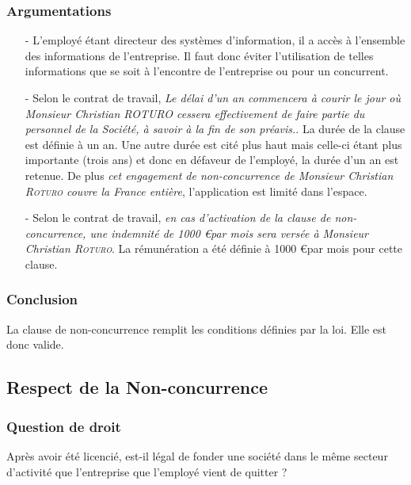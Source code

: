\subsubsection{Argumentations}
\begin{itemize}
\item[-] L'employé étant directeur des systèmes d'information, il a accès à l'ensemble des informations de l'entreprise. Il faut donc éviter l'utilisation de telles informations que se soit à l'encontre de l'entreprise ou pour un concurrent.
\item[-] Selon le contrat de travail, \emph{Le délai d'un an commencera à courir le jour où Monsieur Christian ROTURO cessera effectivement de faire partie du personnel de la Société, à savoir à la fin de son préavis.}. La durée de la clause est définie à un an. Une autre durée est cité plus haut mais celle-ci étant plus importante (trois ans) et donc en défaveur de l'employé, la durée d'un an est retenue. De plus \emph{cet engagement de non-concurrence de Monsieur Christian \textsc{Roturo} couvre la France entière}, l'application est limité dans l'espace.
\item[-] Selon le contrat de travail, \emph{en cas d’activation de la clause de non-concurrence, une indemnité de 1000 \euro par mois sera versée à Monsieur Christian \textsc{Roturo}}. La rémunération a été définie à 1000 \euro par mois pour cette clause.
\end{itemize}
\subsubsection{Conclusion}
La clause de non-concurrence remplit les conditions définies par la loi. Elle est donc valide.

\subsection{Respect de la Non-concurrence}
\subsubsection{Question de droit}
Après avoir été licencié, est-il légal de fonder une société dans le même secteur d'activité que l'entreprise que l'employé vient de quitter ?

